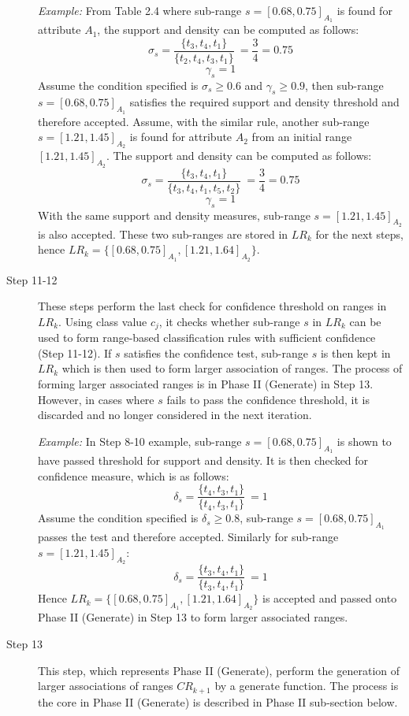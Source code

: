 \begin{description}
\textit{Example: } From Table 2.4 where sub-range $s = [0.68,0.75]_{A_1}$ is found for attribute $A_1$, the support and density can be computed as follows:
\[ \sigma_s = \frac{\{t_3,t_4,t_1\}}{\{t_2,t_4,t_3,t_1\}}\ = \frac{3}{4} = 0.75 \] 
\[ \gamma_s = 1 \] 
Assume the condition specified is $\sigma_s \geq 0.6$ and $\gamma_s \geq 0.9$, then sub-range $s = [0.68,0.75]_{A_1}$ satisfies the required support and density threshold and therefore accepted.  
Assume, with the similar rule, another sub-range $s = [1.21, 1.45]_{A_2}$ is found for attribute $A_2$ from an initial range $[1.21, 1.45]_{A_2}$. The support and density can be computed as follows:
\[ \sigma_s = \frac{\{t_3,t_4,t_1\}}{\{t_3,t_4,t_1,t_5,t_2\}}\ = \frac{3}{4} = 0.75 \] 
\[ \gamma_s = 1 \] 
With the same support and density measures, sub-range  $s = [1.21, 1.45]_{A_2}$ is also accepted.
These two sub-ranges are stored in $LR_k$ for the next steps, hence $LR_k = \{[0.68, 0.75]_{A_1}, [1.21,1.64]_{A_2}\}$. \\

\item[Step 11-12] These steps perform the last check for confidence threshold on ranges in $LR_k$. Using class value $c_j$, it checks whether sub-range $s$ in $LR_k$ can be used to form range-based classification rules with sufficient confidence (Step 11-12). If $s$ satisfies the confidence test, sub-range $s$ is then kept in $LR_k$ which is then used to form larger association of ranges. The process of forming larger associated ranges is in Phase II (Generate) in Step 13. However, in cases where $s$ fails to pass the confidence threshold, it is discarded and no longer considered in the next iteration.

\textit{Example: } In Step 8-10 example, sub-range $s = [0.68,0.75]_{A_1}$ is shown to have passed threshold for support and density. It is then checked for confidence measure, which is as follows:
\[ \delta_s = \frac{\{t_4,t_3,t_1\}}{\{t_4,t_3,t_1\}}\ = 1 \] 
Assume the condition specified is $\delta_s \geq 0.8$, sub-range $s = [0.68,0.75]_{A_1}$ passes the test and therefore accepted.
Similarly for sub-range $s = [1.21, 1.45]_{A_2}$:
\[ \delta_s = \frac{\{t_3,t_4,t_1\}}{\{t_3,t_4,t_1\}}\ = 1 \] 
Hence $LR_k = \{[0.68, 0.75]_{A_1}, [1.21,1.64]_{A_2}\}$ is accepted and passed onto Phase II (Generate) in Step 13 to form larger associated ranges.

\item[Step 13] This step, which represents Phase II (Generate), perform the generation of larger associations of ranges $CR_{k+1}$ by a generate function. The process is the core in Phase II (Generate) is described in Phase II sub-section below.

\end{description}

